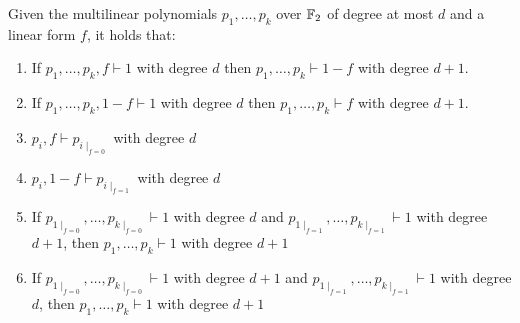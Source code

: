 \begin{lemma}
    \label{ns_properties}
    Given the multilinear polynomials $p_1, \ldots, p_k$ over $\mathbb{F}_2$ of degree at most $d$ and a linear form $f$, it holds that:
    \begin{enumerate}
        \item If $p_1, \ldots, p_k, f \vdash 1$ with degree $d$ then $p_1, \ldots, p_k \vdash 1-f$ with degree $d+1$.
        \item If $p_1, \ldots, p_k, 1-f \vdash 1$ with degree $d$ then $p_1, \ldots, p_k \vdash f$ with degree $d+1$.
        \item $p_i, f \vdash p_{i \mid_{f=0}}$ with degree $d$ 
        \item $p_i, 1-f \vdash p_{i \mid_{f=1}}$ with degree $d$ 
        \item If $p_{1\mid_{f=0}}, \ldots, p_{k\mid_{f=0}} \vdash 1$ with degree $d$ and $p_{1\mid_{f=1}}, \ldots, p_{k\mid_{f=1}} \vdash 1$ with degree $d+1$, then $p_1, \ldots, p_k \vdash 1$ with degree $d+1$
        \item If $p_{1\mid_{f=0}}, \ldots, p_{k\mid_{f=0}} \vdash 1$ with degree $d+1$ and $p_{1\mid_{f=1}}, \ldots, p_{k\mid_{f=1}} \vdash 1$ with degree $d$, then $p_1, \ldots, p_k \vdash 1$ with degree $d+1$
    \end{enumerate}
\end{lemma}

